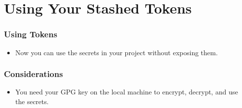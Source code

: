 \documentclass[aspectratio=169]{beamer}
\makeatletter
\def\sectionsubtitle#1{\gdef\@sectionsubtitle{#1}}
\gdef\@sectionsubtitle{}
\makeatother
\begin{document}
{
\sectionsubtitle{\textcolor{black}{How to Use What You Built}}
\section{Using Your Stashed Tokens}
}

%
\begin{frame}
	\frametitle{Using Tokens}
	\begin{itemize}
		\item Now you can use the secrets in your project without exposing them.
	\end{itemize}
\end{frame}

\begin{frame}
	\frametitle{Considerations}
	\begin{itemize}
		\item You need your GPG key on the local machine to encrypt, decrypt, and use the secrets.
	\end{itemize}
\end{frame}
\end{document}
